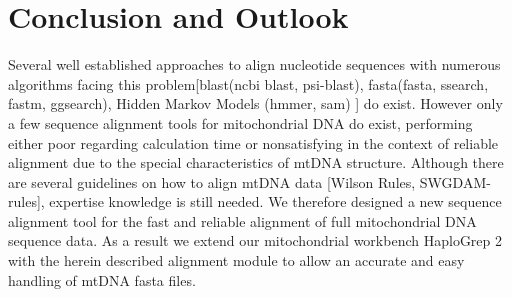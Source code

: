 \section{Conclusion and Outlook}
Several well established approaches to align nucleotide sequences with numerous algorithms facing this problem[blast(ncbi blast, psi-blast), fasta(fasta, ssearch, fastm, ggsearch), Hidden Markov Models (hmmer, sam) ] do exist. However only a few sequence alignment tools for mitochondrial DNA do exist, performing either poor regarding calculation time or nonsatisfying in the context of reliable alignment due to the special characteristics of mtDNA structure. Although there are several guidelines on how to align mtDNA data [Wilson Rules, SWGDAM-rules], expertise knowledge is still needed. We therefore designed a new sequence alignment tool for the fast and reliable alignment of full mitochondrial DNA sequence data. As a result we extend our mitochondrial workbench HaploGrep 2 with the herein described alignment module to allow an accurate and easy handling of mtDNA fasta files.




